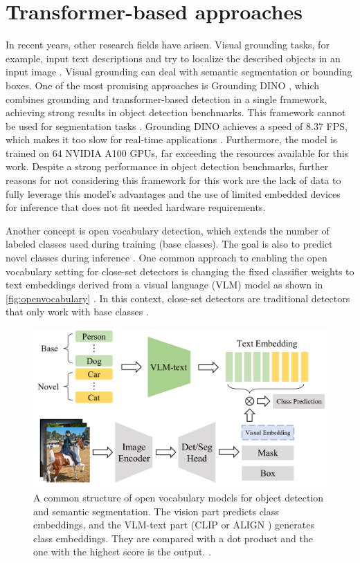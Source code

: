 \section{Transformer-based approaches}
\label{sec:transformerBasedApproaches}

In recent years, other research fields have arisen.
Visual grounding tasks, for example, input text descriptions and try to localize the described objects in an input image \cite{openvocabularysurvey2024}.
Visual grounding can deal with semantic segmentation or bounding boxes.
One of the most promising approaches is Grounding DINO \cite{groundingdino2024}, which combines grounding and transformer-based detection in a single framework, achieving strong results in object detection benchmarks.
This framework cannot be used for segmentation tasks \cite{glipv22022}.
Grounding DINO achieves a speed of 8.37 \ac{FPS}, which makes it too slow for real-time applications \cite{groundingdino2024}.
Furthermore, the model is trained on 64 NVIDIA A100 GPUs, far exceeding the resources available for this work.
Despite a strong performance in object detection benchmarks, further reasons for not considering this framework for this work are the lack of data to fully leverage this model's advantages and the use of limited embedded devices for inference that does not fit needed hardware requirements.

\vspace{0.5cm}

\noindent Another concept is open vocabulary detection, which extends the number of labeled classes used during training (base classes).
The goal is also to predict novel classes during inference \cite{openvocabularysurvey2024}.
One common approach to enabling the open vocabulary setting for close-set detectors is changing the fixed classifier weights to text embeddings derived from a visual language (VLM) model as shown in \autoref{fig:openvocabulary} \cite{openvocabularysurvey2024}.
In this context, close-set detectors are traditional detectors that only work with base classes \cite{anonymous2024openvocabulary}.

\begin{figure}[H]
    \centering
    \includegraphics[width=0.55\linewidth]{PICs/tansformerSOTA/openvocabulary.jpg}
    \caption{A common structure of open vocabulary models for object detection and semantic segmentation. The vision part predicts class embeddings, and the VLM-text part (CLIP \cite{CLIP2021} or ALIGN \cite{ALIGN2021}) generates class embeddings. They are compared with a dot product and the one with the highest score is the output. \cite{openvocabularysurvey2024}.}
    \label{fig:openvocabulary}
\end{figure}

